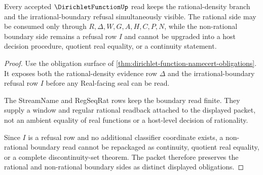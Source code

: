 \begin{theorem}
\label{thm:dirichlet-function-rational-irrational-boundary}
Every accepted $\DirichletFunctionUp$ read keeps the rational-density branch and the irrational-boundary refusal simultaneously visible. The rational side may be consumed only through $R,\Delta,W,G,A,H,C,P,N$, while the non-rational boundary side remains a refusal row $I$ and cannot be upgraded into a host decision procedure, quotient real equality, or a continuity statement.
\end{theorem}
\begin{proof}
Use the obligation surface of \autoref{thm:dirichlet-function-namecert-obligations}. It exposes both the rational-density evidence row $\Delta$ and the irrational-boundary refusal row $I$ before any Real-facing seal can be read.

The StreamName and RegSeqRat rows keep the boundary read finite. They supply a window and regular rational readback attached to the displayed packet, not an ambient equality of real functions or a host-level decision of rationality.

Since $I$ is a refusal row and no additional classifier coordinate exists, a non-rational boundary read cannot be repackaged as continuity, quotient real equality, or a complete discontinuity-set theorem. The packet therefore preserves the rational and non-rational boundary sides as distinct displayed obligations.
\end{proof}


